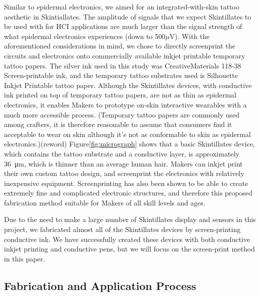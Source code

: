 \documentclass{sigchi}
\begin{document}
Similar to epidermal electronics, we aimed for an integrated-with-skin tattoo aesthetic in Skintiallates. The amplitude of signals that we expect Skintillates to be used with for HCI applications are much larger than the signal strength of what epidermal electronics experiences (down to 500$\mu$V). 
With the aforementioned considerations in mind, we chose to directly screenprint the circuits and electronics onto commercially available inkjet printable temporary tattoo papers. The silver ink used in this study was CreativeMaterials 118-38 Screen-printable ink, and the temporary tattoo substrates used is Silhouette Inkjet Printable tattoo paper. Although the Skintillates devices, with conductive ink printed on top of temporary tattoo papers, are not as thin as epidermal electronics, it enables Makers to prototype on-skin interactive wearables with a much more accessible process. (Temporary tattoo papers are commonly used among crafters, it is therefore reasonable to assume that consumers find it acceptable to wear on skin although it’s not as conformable to skin as epidermal electronics.)(reword) Figure\ref{fig:micrograph} shows that a basic Skintillates device, which contains the tattoo substrate and a conductive layer, is approximately 36\SI{}{\micro\metre}, which is thinner than an average human hair. Makers can inkjet print their own custom tattoo design, and screenprint the electronics with relatively inexpensive equipment. Screenprinting has also been shown to be able to create extremely fine and complicated electronic structures, and therefore this proposed fabrication method suitable for Makers of all skill levels and ages.

Due to the need to make a large number of Skintillates display and sensors in this project, we fabricated almost all of the Skintillates devices by screen-printing conductive ink. We have successfully created these devices with both conductive inkjet printing and conductive pens, but we will focus on the screen-print method in this paper. 

\subsection{Fabrication and Application Process}
\end{document}
